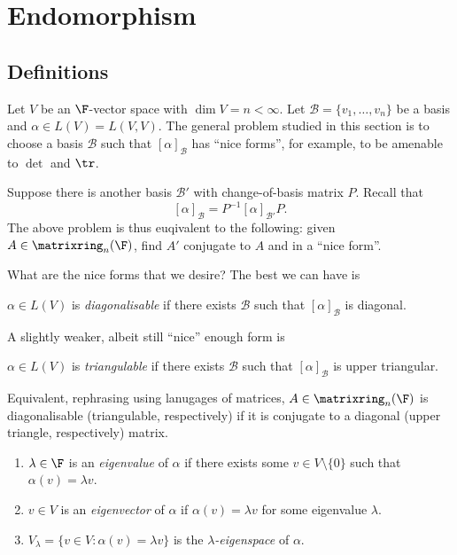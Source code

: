 \documentclass[a4paper]{article}
\newcommand*{\M}{\matrixring}
\newcommand*{\basis}{\mathcal}
\theoremstyle{definition}
\begin{document}
\section{Endomorphism}

\subsection{Definitions}

Let \(V\) be an \(\F\)-vector space with \(\dim V = n < \infty\). Let \(\basis B =\{v_1, \dots, v_n\}\) be a basis and \(\alpha \in L(V) = L(V, V)\). The general problem studied in this section is to choose a basis \(\basis B\) such that \([\alpha]_{\basis B}\) has ``nice forms'', for example, to be amenable to \(\det\) and \(\tr\).

Suppose there is another basis \(\basis B'\) with change-of-basis matrix \(P\). Recall that
\[
  [\alpha]_{\basis B} = P^{-1}[\alpha]_{\basis B'}P.
\]
The above problem is thus euqivalent to the following: given \(A \in \M_n(\F)\), find \(A'\) conjugate to \(A\) and in a ``nice form''.

What are the nice forms that we desire? The best we can have is

\begin{definition}[Diagonalisable]
  \(\alpha \in L(V)\) is \emph{diagonalisable} if there exists \(\basis B\) such that \([\alpha]_{\basis B}\) is diagonal.
\end{definition}

A slightly weaker, albeit still ``nice'' enough form is

\begin{definition}[Triangulable]
  \(\alpha \in L(V)\) is \emph{triangulable} if there exists \(\basis B\) such that \([\alpha]_{\basis B}\) is upper triangular.
\end{definition}

Equivalent, rephrasing using lanugages of matrices, \(A \in \M_n(\F)\) is diagonalisable (triangulable, respectively) if it is conjugate to a diagonal (upper triangle, respectively) matrix.

\begin{definition}\leavevmode
  \begin{enumerate}
  \item \(\lambda \in \F\) is an \emph{eigenvalue} of \(\alpha\) if there exists some \(v \in V\setminus\{0\}\) such that \(\alpha(v) = \lambda v\).
  \item \(v \in V\) is an \emph{eigenvector} of \(\alpha\) if \(\alpha(v) = \lambda v\) for some eigenvalue \(\lambda\).
  \item \(V_\lambda = \{v \in V: \alpha(v) = \lambda v\}\) is the \emph{\(\lambda\)-eigenspace} of \(\alpha\).
  \end{enumerate}
\end{definition}
\end{document}
